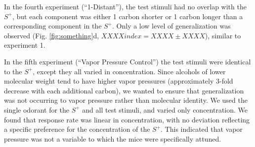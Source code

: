 In the fourth experiment (``1-Distant''), the test stimuli had no overlap with the $S^+$, but each component was either 1 carbon shorter or 1 carbon longer than a corresponding component in the $S^+$.  Only a low level of generalization was observed (Fig. \ref{fig:something}d, $XXXX index = XXXX \pm XXXX$), similar to experiment 1.  

In the fifth experiment (``Vapor Pressure Control'') the test stimuli were identical to the $S^+$, except they all varied in concentration.  Since alcohols of lower molecular weight tend to have higher vapor pressures (approximately 3-fold decrease with each additional carbon), we wanted to ensure that generalization was not occurring to vapor pressure rather than molecular identity.  We used the single odorant for the $S^+$ and all test stimuli, and varied only concentration.  We found that response rate was linear in concentration, with no deviation reflecting a specific preference for the concentration of the $S^+$.  This indicated that vapor pressure was not a variable to which the mice were specifically attuned.  